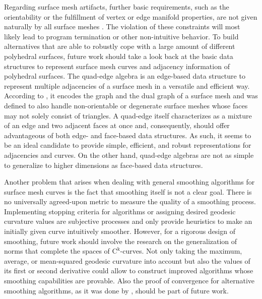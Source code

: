 \documentclass[crop=false]{stdlocal}
\begin{document}
  Regarding surface mesh artifacts, further basic requirements, such as the orientability or the fulfillment of vertex or edge manifold properties, are not given naturally by all surface meshes \autocite{thingi10k}.
  The violation of these constraints will most likely lead to program termination or other non-intuitive behavior.
  To build alternatives that are able to robustly cope with a large amount of different polyhedral surfaces, future work should take a look back at the basic data structures to represent surface mesh curves and adjacency information of polyhedral surfaces.
  The quad-edge algebra is an edge-based data structure to represent multiple adjacencies of a surface mesh in a versatile and efficient way.
  According to \textcite{guibas1985}, it encodes the graph and the dual graph of a surface mesh and was defined to also handle non-orientable or degenerate surface meshes whose faces may not solely consist of triangles.
  A quad-edge itself characterizes as a mixture of an edge and two adjacent faces at once and, consequently, should offer advantageous of both edge- and face-based data structures.
  As such, it seems to be an ideal candidate to provide simple, efficient, and robust representations for adjacencies and curves.
  On the other hand, quad-edge algebras are not as simple to generalize to higher dimensions as face-based data structures.

  Another problem that arises when dealing with general smoothing algorithms for surface mesh curves is the fact that smoothing itself is not a clear goal.
  There is no universally agreed-upon metric to measure the quality of a smoothing process.
  Implementing stopping criteria for algorithms or assigning desired geodesic curvature values are subjective processes and only provide heuristics to make an initially given curve intuitively smoother.
  However, for a rigorous design of smoothing, future work should involve the research on the generalization of norms that complete the spaces of $\mathrm{C^k}$-curves.
  Not only taking the maximum, average, or mean-squared geodesic curvature into account but also the values of its first or second derivative could allow to construct improved algorithms whose smoothing capabilities are provable.
  Also the proof of convergence for alternative smoothing algorithms, as it was done by \textcite{lawonn2014}, should be part of future work.
\end{document}
